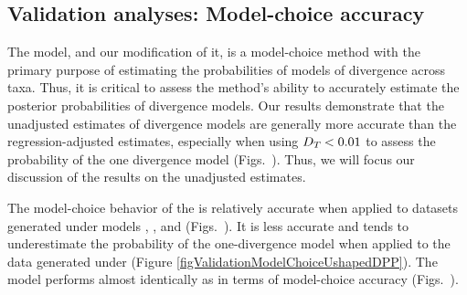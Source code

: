 \subsection*{Validation analyses: Model-choice accuracy}
The \msb model, and our modification of it, is a model-choice method
with the primary purpose of estimating the probabilities of models
of divergence across taxa.
Thus, it is critical to assess the method's ability to accurately
estimate the posterior probabilities of divergence models.
Our results demonstrate that the unadjusted estimates of divergence models are
generally more accurate than the regression-adjusted estimates, especially when
using $D_{T_{}} < 0.01$ to assess the probability of the one
divergence model (Figs.\
).
Thus, we will focus our discussion of the results on the unadjusted estimates.

The model-choice behavior of the \modelDPP is relatively accurate when applied
to datasets generated under models \modelDPP, \modelUniform, and \modelOld
(Figs.\
).
It is less accurate and tends to underestimate the probability of the
one-divergence model when applied to the data generated under \modelUshaped
(Figure \ref{figValidationModelChoiceUshapedDPP}).
The \modelUniform model performs almost identically as \modelDPP in
terms of model-choice accuracy (Figs.\
).


